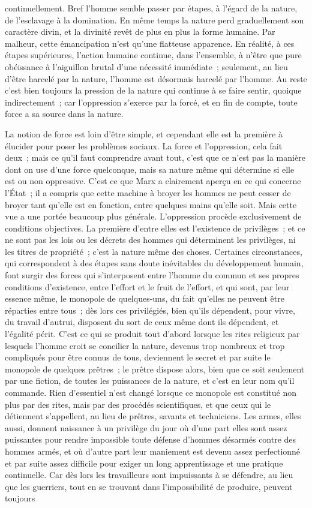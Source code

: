 \documentclass[french,twoside]{book} %
\begin{document}
continuellement. Bref l'homme semble passer par étapes, à l'égard de la nature, de l'esclavage à la domination. En même temps la nature perd graduellement son caractère divin, et la divinité revêt de plus en plus la forme humaine. Par malheur, cette émancipation n'est qu'une flatteuse apparence. En réalité, à ces étapes supérieures, l'action humaine continue, dans l'ensemble, à n'être que pure obéissance à l'aiguillon brutal d'une nécessité immédiate ; seulement, au lieu d'être harcelé par la nature, l'homme est désormais harcelé par l'homme. Au reste c'est bien toujours la pression de la nature qui continue à se faire sentir, quoique indirectement ; car l'oppression s'exerce par la forcé, et en fin de compte, toute force a sa source dans la nature.\par
La notion de force est loin d'être simple, et cependant elle est la première à élucider pour poser les problèmes sociaux. La force et l'oppression, cela fait deux ; mais ce qu'il faut comprendre avant tout, c'est que ce n'est pas la manière dont on use d'une force quelconque, mais sa nature même qui détermine si elle est ou non oppressive. C'est ce que Marx a clairement aperçu en ce qui concerne l'État ; il a compris que cette machine à broyer les hommes ne peut cesser de broyer tant qu'elle est en fonction, entre quelques mains qu'elle soit. Mais cette vue a une portée beaucoup plus générale. L'oppression procède exclusivement de conditions objectives. La première d'entre elles est l'existence de privilèges ; et ce ne sont pas les lois ou les décrets des hommes qui déterminent les privilèges, ni les titres de propriété ; c'est la nature même des choses. Certaines circonstances, qui correspondent à des étapes sans doute inévitables du développement humain, font surgir des forces qui s'interposent entre l'homme du commun et ses propres conditions d'existence, entre l'effort et le fruit de l'effort, et qui sont, par leur essence même, le monopole de quelques-uns, du fait qu'elles ne peuvent être réparties entre tous ; dès lors ces privilégiés, bien qu'ils dépendent, pour vivre, du travail d'autrui, disposent du sort de ceux même dont ils dépendent, et l'égalité périt. C'est ce qui se produit tout d'abord lorsque les rites religieux par lesquels l'homme croit se concilier la nature, devenus trop nombreux et trop compliqués pour être connus de tous, deviennent le secret et par suite le monopole de quelques prêtres ; le prêtre dispose alors, bien que ce soit seulement par une fiction, de toutes les puissances de la nature, et c'est en leur nom qu'il commande. Rien d'essentiel n'est changé lorsque ce monopole est constitué non plus par des rites, mais par des procédés scientifiques, et que ceux qui le détiennent s'appellent, au lieu de prêtres, savants et techniciens. Les armes, elles aussi, donnent naissance à un privilège du jour où d'une part elles sont assez puissantes pour rendre impossible toute défense d'hommes désarmés contre des hommes armés, et où d'autre part leur maniement est devenu assez perfectionné et par suite assez difficile pour exiger un long apprentissage et une pratique continuelle. Car dès lors les travailleurs sont impuissants à se défendre, au lieu que les guerriers, tout en se trouvant dans l'impossibilité de produire, peuvent toujours 
\end{document}
